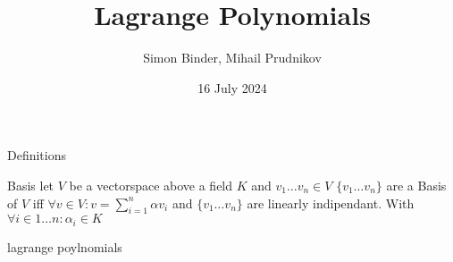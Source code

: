 \documentclass[8pt]{beamer}
\title{Lagrange Polynomials}
\date{16 July 2024}
\author{Simon Binder, Mihail Prudnikov}
\begin{document}
\begin{frame}[plain]
    \maketitle
\end{frame}
\begin{frame}{Definitions}
	\begin{block}{Basis}
		let $V$ be a vectorspace above a field $K$ and $v_1 \ldots v_n \in V$ $\{ v_1 \ldots v_n\} $ are a Basis of $V$ iff $\forall v \in V: v = \sum_{i =1}^{n}\alpha v_i$ and $\{ v_1 \ldots v_n\}$ are linearly indipendant. With $\forall i \in 1\ldots n: \alpha_i \in K $
	\end{block}
	\begin{block}{lagrange poylnomials}
		
	\end{block}
\end{frame}
\end{document}
